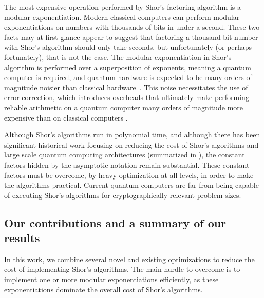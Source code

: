 \documentclass[a4paper, onecolumn, accepted=2021-03-29]{quantumarticle}
\begin{document}
The most expensive operation performed by Shor's factoring algorithm is a modular exponentiation.
Modern classical computers can perform modular exponentiations on numbers with thousands of bits in under a second.
These two facts may at first glance appear to suggest that factoring a thousand bit number with Shor's algorithm should only take seconds, but unfortunately (or perhaps fortunately), that is not the case.
The modular exponentiation in Shor's algorithm is performed over a superposition of exponents, meaning a quantum computer is required, and quantum hardware is expected to be many orders of magnitude noisier than classical hardware~\cite{schroeder2009dram,Bare13,Kim2014}.
This noise necessitates the use of error correction, which introduces overheads that ultimately make performing reliable arithmetic on a quantum computer many orders of magnitude more expensive than on classical computers \cite{fowler2012surfacecodereview, campbell2018constraintsatisfaction}.

Although Shor's algorithms run in polynomial time, and although there has been significant historical work focusing on reducing the cost of Shor's algorithms and large scale quantum computing architectures \cite{vedral1996arithmetic,beckman1996efficient,cleve2000fast,oskin2002practical,copsey2003toward,bravyi2005distillation,whitney2009fault,van2010distributed,jones2012layered,pavlidis2012fast,fowler2012time,fowler2012surfacecodereview,horsman2012latticesurgery,fowler2018,ekeraa2016modifying} (summarized in \cite{vanquantumcomputerarchitecture}), the constant factors hidden by the asymptotic notation remain substantial.
These constant factors must be overcome, by heavy optimization at all levels, in order to make the algorithms practical.
Current quantum computers are far from being capable of executing Shor's algorithms for cryptographically relevant problem sizes.

\subsection{Our contributions and a summary of our results}

In this work, we combine several novel and existing optimizations to reduce the cost of implementing Shor's algorithms.
The main hurdle to overcome is to implement one or more modular exponentiations efficiently, as these exponentiations dominate the overall cost of Shor's algorithms.
\end{document}
